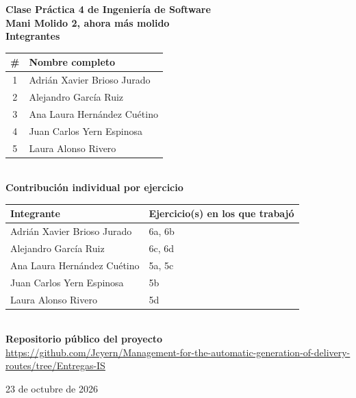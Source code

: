 \documentclass[11pt,a4paper]{article}
\begin{document}
\begin{titlepage}
    \centering
    \vspace*{1.5cm}
    
    {\Large \textbf{Clase Práctica 4 de Ingeniería de Software}}\\[2cm]
    
    {\Huge \textbf{Mani Molido 2, ahora más molido}}\\[3cm]
    
    {\large \textbf{Integrantes}}\\[0.5cm]
    \begin{tabular}{cl}
        \toprule
        \# & Nombre completo \\
        \midrule
        1 & Adrián Xavier Brioso Jurado \\
        2 & Alejandro García Ruiz \\
        3 & Ana Laura Hernández Cuétino \\
        4 & Juan Carlos Yern Espinosa \\
        5 & Laura Alonso Rivero \\
        \bottomrule
    \end{tabular}\\[2cm]
    
    {\large \textbf{Contribución individual por ejercicio}}\\[0.5cm]
    \begin{tabular}{ll}
        \toprule
        Integrante & Ejercicio(s) en los que trabajó \\
        \midrule
        Adrián Xavier Brioso Jurado & 6a, 6b \\
        Alejandro García Ruiz & 6c, 6d \\
        Ana Laura Hernández Cuétino & 5a, 5c \\
        Juan Carlos Yern Espinosa & 5b \\
        Laura Alonso Rivero & 5d \\
        \bottomrule
    \end{tabular}\\[2cm]
    
    {\large \textbf{Repositorio público del proyecto}}\\[0.5cm]
    \url{https://github.com/Jcyern/Management-for-the-automatic-generation-of-delivery-routes/tree/Entregas-IS}
    
    \vfill
    
    23 de octubre de 2026
\end{titlepage}
\end{document}
